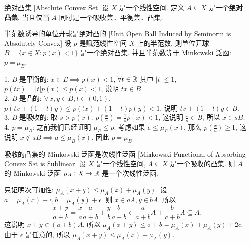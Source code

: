         \begin{dfn}
            {绝对凸集}
            [Absolute Convex Set]
            设 \(X\) 是一个线性空间. 定义 \(A\subseteq X\) 是一个\textbf{绝对凸集}, 当且仅当 \(A\) 同时是一个吸收集、平衡集、凸集.
        \end{dfn}

        \begin{thm}
            {半范数诱导的单位开球是绝对凸的}
            [Unit Open Ball Induced by Seminorm is Absolutely Convex]
            设 $p$ 是赋范线性空间 $X$ 上的半范数. 则单位开球 $B = \{x \in X: p(x) < 1\}$ 是一个绝对凸集. 并且半范数等于 Minkowski 泛函: $p = \mu_B$.
        \end{thm}

        \begin{prf}
            1. \(B\) 是平衡的: \(x\in B\implies p(x)<1\), \(\forall t\in\operatorname{\mathbb{R}}\) 其中 \(|t|\leq 1\), \(p(tx)=|t|p(x)\leq p(x)<1\), 说明 \(tx\in B\).\\
            2. \(B\) 是凸的: \(\forall\,x,y\in B, t\in (0,1)\), \(p(tx+(1-t)y)\leq p(tx)+(1-t)p(y)<1\), 说明 \(tx+(1-t)y\in B\).\\
            3. \(B\) 是吸收的: 取 \(s>p(x)\). \(p(\frac{x}{s})=\frac{1}{s}p(x)<1\), 这说明 \(\frac{x}{s}\in B\), 所以 \(x\in sB\).\\
            4. \(p=\mu_B\): 之前我们已经证明 \(\mu_B\leq p\). 考虑如果 \(a\leq\mu_B(x)\), 那么 \(p(\frac{x}{a})\geq 1\), 这说明 \(x\notin aB\implies a\leq\mu_B(x)\). 因此 \(p=\mu_B\).
        \end{prf}

        \begin{thm}
            {吸收的凸集的 Minkowski 泛函是次线性泛函}
            [Minkowski Functional of Absorbing Convex Set is Sublinear]
            设 \(X\) 是一个线性空间, \(A\subseteq X\) 是一个吸收的凸集. 则 \(A\) 的 Minkowski 泛函 \(\mu_A:X\to\operatorname{\mathbb{R}}\) 是一个次线性泛函.
        \end{thm}

        \begin{prf}
            只证明次可加性: \(\mu_A(x+y)\leq\mu_A(x)+\mu_A(y)\). 设 \(a=\mu_A(x)+\epsilon, b=\mu_A(y)+\epsilon\). 则 \(x\in aA, y\in bA\). 所以
            \[\frac{x+y}{a+b}=\frac{x}{a}\frac{a}{a+b}+\frac{y}{b}\frac{b}{a+b} \in\frac{a}{a+b}A+\frac{b}{a+b}A\subseteq A.\]
            这说明 \(x+y\in (a+b)A\). 所以 \(\mu_A(x+y)\leq a+b=\mu_A(x)+\mu_A(y)+2\epsilon\). 由于 \(\epsilon\) 是任意的, 所以 \(\mu_A(x+y)\leq\mu_A(x)+\mu_A(y)\).
        \end{prf}

